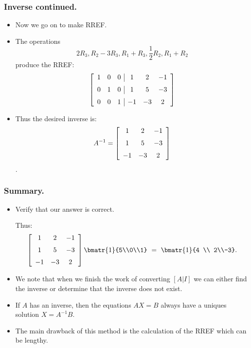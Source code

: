 \begin{frame}%
  \frametitle{Inverse continued.}
  \begin{itemize}%
\item Now we go on to make RREF.

\item The operations
$$2R_3, R_2-3R_3, R_1+R_3, \frac{1}{2}R_2, R_1+R_2$$
produce the RREF:
$$\left[ \begin {array}{ccc|ccc} 1&0&0&1&2&-1\\\noalign{\medskip}
0&1&0&1&5&-3\\\noalign{\medskip}
0&0&1&-1&-3&2\end {array} \right]
$$

\item Thus the desired inverse is:
$$
A^{-1}=\left[ \begin {array}{ccc} 1&2&-1\\\noalign{\medskip}
1&5&-3\\\noalign{\medskip}
-1&-3&2\end {array} \right]
$$.

\end{itemize}
\end{frame}

\begin{frame}%
  \frametitle{ Summary.}
  \begin{itemize}%

\item Verify that our answer is correct.

Thus: 
$$\left[ \begin {array}{ccc} 1&2&-1\\\noalign{\medskip}
1&5&-3\\\noalign{\medskip}
-1&-3&2\end {array} \right] \bmatr{1}{5\\0\\1}
~=~ \bmatr{1}{4 \\ 2\\-3}.$$

\item We note that when we finish the work of converting
$\left[A|I\right]$ we can either find the inverse or determine that the
inverse does not exist.

\item If $A$ has an inverse, then the equations $AX=B$ always have a
uniques solution $X=A^{-1}B$.


\item The main drawback of this method is the calculation of the RREF
which can be lengthy.

\end{itemize}
\end{frame}

